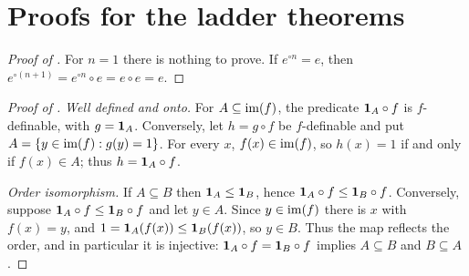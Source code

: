 \section{Proofs for the ladder theorems}\label{app:packdef}

\begin{proof}[Proof of ]
For $n=1$ there is nothing to prove.
If $e^{\circ n}=e$, then $e^{\circ(n+1)}=e^{\circ n}\circ e=e\circ e=e$.
\end{proof}

\begin{proof}[Proof of ]
\emph{Well defined and onto.}
For $A\subseteq\mathrm{im}(f)$, the predicate $\mathbf{1}_A\circ f$ is $f$-definable, with $g=\mathbf{1}_A$.
Conversely, let $h=g\circ f$ be $f$-definable and put $A=\{y\in\mathrm{im}(f):g(y)=1\}$.
For every $x$, $f(x)\in\mathrm{im}(f)$, so $h(x)=1$ if and only if $f(x)\in A$; thus $h=\mathbf{1}_A\circ f$.

\emph{Order isomorphism.}
If $A\subseteq B$ then $\mathbf{1}_A\le\mathbf{1}_B$, hence $\mathbf{1}_A\circ f\le\mathbf{1}_B\circ f$.
Conversely, suppose $\mathbf{1}_A\circ f\le\mathbf{1}_B\circ f$ and let $y\in A$.
Since $y\in\mathrm{im}(f)$ there is $x$ with $f(x)=y$, and $1=\mathbf{1}_A(f(x))\le\mathbf{1}_B(f(x))$, so $y\in B$.
Thus the map reflects the order, and in particular it is injective: $\mathbf{1}_A\circ f=\mathbf{1}_B\circ f$ implies $A\subseteq B$ and $B\subseteq A$.
\end{proof}
